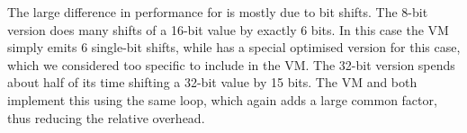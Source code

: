 The large difference in performance for  is mostly due to bit shifts. The 8-bit version does many shifts of a 16-bit value by exactly 6 bits. In this case the VM simply emits 6 single-bit shifts, while  has a special optimised version for this case, which we considered too specific to include in the VM. The 32-bit version spends about half of its time shifting a 32-bit value by 15 bits. The VM and  both implement this using the same loop, which again adds a large common factor, thus reducing the relative overhead.


%
%
%
%

